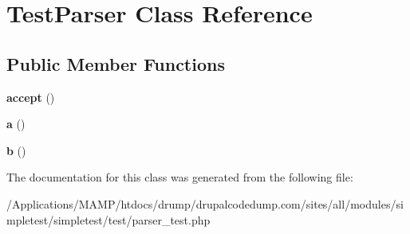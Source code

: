 \hypertarget{class_test_parser}{
\section{TestParser Class Reference}
\label{class_test_parser}
}
\subsection*{Public Member Functions}
\begin{DoxyCompactItemize}
\item 
\hypertarget{class_test_parser_a6137be567aea2381b20493b8004db12a}{
{\bfseries accept} ()}
\label{class_test_parser_a6137be567aea2381b20493b8004db12a}

\item 
\hypertarget{class_test_parser_a974292e0267168031eb6151775901ec9}{
{\bfseries a} ()}
\label{class_test_parser_a974292e0267168031eb6151775901ec9}

\item 
\hypertarget{class_test_parser_a7ee79aa830ab8c9d67bb80025dc4826a}{
{\bfseries b} ()}
\label{class_test_parser_a7ee79aa830ab8c9d67bb80025dc4826a}

\end{DoxyCompactItemize}


The documentation for this class was generated from the following file:\begin{DoxyCompactItemize}
\item 
/Applications/MAMP/htdocs/drump/drupalcodedump.com/sites/all/modules/simpletest/simpletest/test/parser\_\-test.php\end{DoxyCompactItemize}
